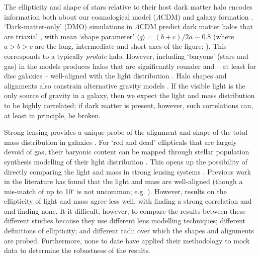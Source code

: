 \documentclass[useAMS,usenatbib]{mn2e}
\begin{document}
The ellipticity and shape of stars relative to their host dark matter halo encodes information both about our cosmological model ($\Lambda$CDM) and galaxy formation \citep[e.g.][]{1994ApJ...431..617D,2001ApJ...551..294I,2004ApJ...611L..73K,2007MNRAS.378...55M,2007arXiv0707.0737D,2012MNRAS.424L..16L,2014JPhG...41f3101R}. `Dark-matter-only' (DMO) simulations in $\Lambda$CDM predict dark matter halos that are triaxial \citep{1991ApJ...378..496D,1992ApJ...399..405W,1996ApJ...462..563N,2002ApJ...574..538J}, with mean `shape parameter' $\langle q \rangle = (b+c)/2a \sim 0.8$ (where $a > b > c$ are the long, intermediate and short axes of the figure; \citealt{2007MNRAS.378...55M}). This corresponds to a typically {\it prolate} halo. However, including `baryons' (stars and gas) in the models produces halos that are significantly rounder and -- at least for disc galaxies -- well-aligned with the light distribution \citep{1991ApJ...377..365K,1994ApJ...431..617D,2007arXiv0707.0737D}. Halo shapes and alignments also constrain alternative gravity models \citep{2001MNRAS.327..552M,2004ApJ...610L..97H,2005MNRAS.361..971R,2012PhRvD..86h3507F,2013MNRAS.434.2971D}. If the visible light is the only source of gravity in a galaxy, then we expect the light and mass distribution to be highly correlated; if dark matter is present, however, such correlations can, at least in principle, be broken.

Strong lensing provides a unique probe of the alignment and shape of the total mass distribution in galaxies \citep[e.g.][]{1986ApJ...310..568B,1992grle.book.....S,1998ApJ...509..561K,2000ApJ...543..131K,2006ApJ...649..599K,2007AJ....134..668A,2008MNRAS.383..857F,2010ApJ...724..511A,2012MNRAS.424..104L}. For `red and dead' ellipticals that are largely devoid of gas, their baryonic content can be mapped through stellar population synthesis modelling of their light distribution \citep[e.g.][]{2005ApJ...623L...5F,2006ApJ...640..662T,2008MNRAS.383..857F}. This opens up the possibility of directly comparing the light and mass in strong lensing systems \citep{1998ApJ...509..561K,2008MNRAS.383..857F,2009ApJ...690..670T,2012A&A...538A..99S}. Previous work in the literature has found that the light and mass are well-aligned (though a mis-match of up to 10$^\circ$ is not uncommon; e.g. \citealt{2012A&A...538A..99S}). However, results on the ellipticity of light and mass agree less well, with \citet{2012A&A...538A..99S} finding a strong correlation and \citet{1998ApJ...509..561K} and \citet{2008MNRAS.383..857F} finding none. It it difficult, however, to compare the results between these different studies because they use different lens modelling techniques; different definitions of ellipticity; and different radii over which the shapes and alignments are probed. Furthermore, none to date have applied their methodology to mock data to determine the robustness of the results.
\end{document}
